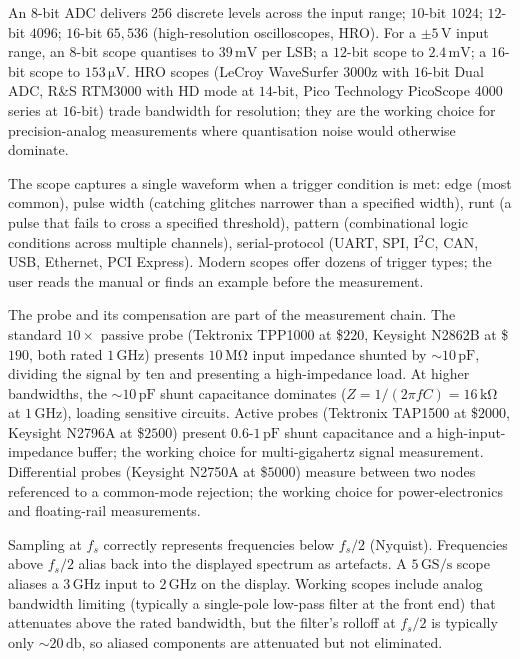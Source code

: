  An $8$-bit ADC delivers $256$
discrete levels across the input range; $10$-bit $1024$; $12$-bit
$4096$; $16$-bit $65{,}536$ (high-resolution oscilloscopes, HRO).
For a $\pm 5\,\si{\volt}$ input range, an $8$-bit scope quantises
to $39\,\si{\milli\volt}$ per LSB; a $12$-bit scope to $2.4\,\si{
\milli\volt}$; a $16$-bit scope to $153\,\si{\micro\volt}$. HRO
scopes (LeCroy WaveSurfer 3000z with $16$-bit Dual ADC, R\&S
RTM3000 with HD mode at $14$-bit, Pico Technology PicoScope 4000
series at $16$-bit) trade bandwidth for resolution; they are the
working choice for precision-analog measurements where
quantisation noise would otherwise dominate.

 The scope captures a single waveform when a
trigger condition is met: edge (most common), pulse width
(catching glitches narrower than a specified width), runt (a
pulse that fails to cross a specified threshold), pattern
(combinational logic conditions across multiple channels),
serial-protocol (UART, SPI, I$^{2}$C, CAN, USB, Ethernet,
PCI Express). Modern scopes offer dozens of trigger types;
the user reads the manual or finds an example before the
measurement.

 The probe and its compensation are part of the
measurement chain. The standard $10\times$ passive probe
(Tektronix TPP1000 at \$$220$, Keysight N2862B at \$$190$,
both rated $1\,\si{\giga\hertz}$) presents $10\,\si{\mega\ohm}$
input impedance shunted by $\sim 10\,\si{\pico\farad}$, dividing
the signal by ten and presenting a high-impedance load. At higher
bandwidths, the $\sim 10\,\si{\pico\farad}$ shunt capacitance
dominates ($Z = 1/(2\pi f C) = 16\,\si{\kilo\ohm}$ at $1\,\si{
\giga\hertz}$), loading sensitive circuits. Active probes
(Tektronix TAP1500 at \$$2000$, Keysight N2796A at \$$2500$)
present $0.6$-$1\,\si{\pico\farad}$ shunt capacitance and a
high-input-impedance buffer; the working choice for
multi-gigahertz signal measurement. Differential probes
(Keysight N2750A at \$$5000$) measure between two nodes
referenced to a common-mode rejection; the working choice for
power-electronics and floating-rail measurements.

 Sampling at $f_{s}$
correctly represents frequencies below $f_{s}/2$ (Nyquist).
Frequencies above $f_{s}/2$ alias back into the displayed
spectrum as artefacts. A $5\,\text{GS/s}$ scope aliases a $3\,
\si{\giga\hertz}$ input to $2\,\si{\giga\hertz}$ on the display.
Working scopes include analog bandwidth limiting (typically a
single-pole low-pass filter at the front end) that attenuates
above the rated bandwidth, but the filter's rolloff at
$f_{s}/2$ is typically only $\sim 20\,\si{\decibel}$, so
aliased components are attenuated but not eliminated.

